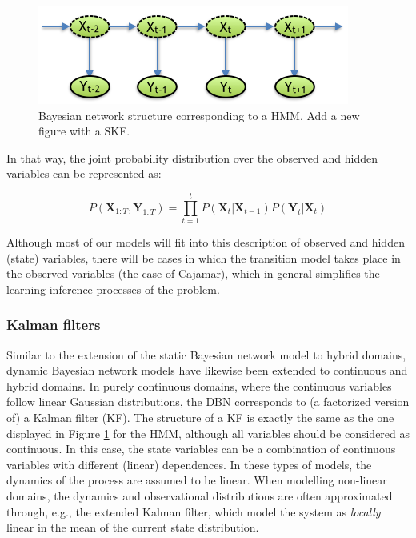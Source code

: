 \begin{figure}
\begin{center}
\includegraphics[scale=0.56]{./figures/PreliminariesHMM}
\caption{\label{Figure:HMM}Bayesian network structure corresponding to a HMM. {\color{red} Add a new figure with a SKF.}}
\end{center}
\end{figure}



In that way, the joint probability distribution over the observed and hidden variables can be represented as:

\begin{equation}
P(\bm X_{1:T},\bm Y_{1:T}) = \prod_{t=1}^t{P(\bm X_t| \bm X_{t-1})P(\bm Y_t|\bm X_t)}
\end{equation}

Although most of our models will fit into this description of observed and hidden (state) variables, there will be cases in which the transition model takes place in the observed variables (the case of Cajamar), which in general simplifies the learning-inference processes of the problem.


\subsubsection{Kalman filters}
Similar to the extension of the static Bayesian network model to hybrid domains, dynamic Bayesian network models have likewise been extended to continuous and hybrid domains. In purely continuous domains, where the continuous variables follow linear Gaussian distributions, the DBN corresponds to (a factorized version of) a Kalman filter (KF). The structure of a KF is exactly the same as the one displayed in Figure \ref{Figure:HMM} for the HMM, although all variables should be considered as continuous. In this case, the state variables can be a combination of continuous variables with different (linear) dependences. In these types of models, the dynamics of the process are assumed to be linear. When modelling non-linear domains, the dynamics and observational distributions are often approximated through, e.g., the extended Kalman filter, which model the system as \textit{locally} linear in the mean of the current state distribution. 

